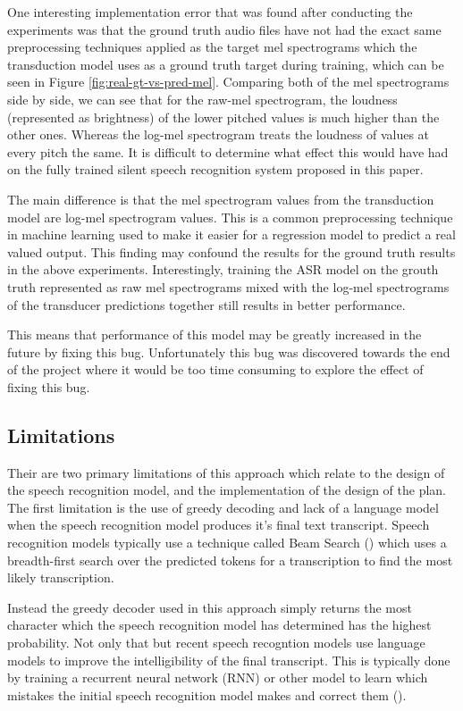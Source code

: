 One interesting implementation error that was found after conducting the experiments
was that the ground truth audio files have not had the exact same preprocessing techniques
applied as the target mel spectrograms which the transduction model uses as a ground truth
target during training, which can be seen in Figure \ref{fig:real-gt-vs-pred-mel}.
Comparing both of the mel spectrograms side by side, we can see
that for the raw-mel spectrogram, the loudness (represented as brightness) of the lower
pitched values is much higher than the other ones. Whereas the log-mel spectrogram
treats the loudness of values at every pitch the same. It is difficult to determine what
effect this would have had on the fully trained silent speech recognition system
proposed in this paper.

The main difference is that the mel spectrogram values from the transduction model are
log-mel spectrogram values. This is a common preprocessing technique in machine learning
used to make it easier for a regression model to predict a real valued output. This finding
may confound the results for the ground truth results in the above experiments. Interestingly,
training the ASR model on the grouth truth represented as raw mel spectrograms mixed
with the log-mel spectrograms of the transducer predictions together still results in better
performance.

This means that performance of this model may be greatly increased in the future by fixing
this bug. Unfortunately this bug was discovered towards the end of the project where it would
be too time consuming to explore the effect of fixing this bug.

\subsection{Limitations}

Their are two primary limitations of this approach which relate to the design
of the speech recognition model, and the implementation of the design of the plan.
The first limitation is the use of greedy decoding and lack of a language model
when the speech recognition model produces it's final text transcript.
Speech recognition models typically use a technique called Beam Search
(\cite{beam_search}) which uses a breadth-first search over the predicted tokens
for a transcription to find the most likely transcription.

Instead the greedy decoder used in this approach simply returns the most character
which the speech recognition model has determined has the highest probability.
Not only that but recent speech recogntion models use language models to
improve the intelligibility of the final transcript. This is typically done
by training a recurrent neural network (RNN) or other model to learn which
mistakes the initial speech recognition model makes and correct them
(\cite{language_model}).


